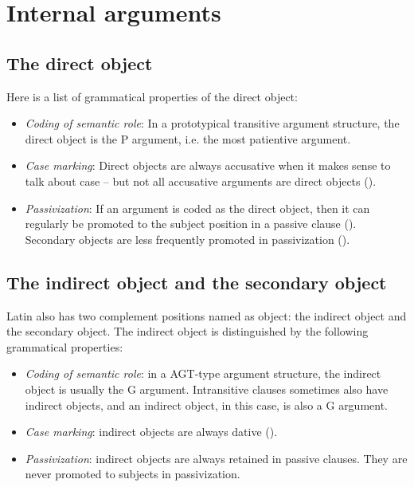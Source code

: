 \documentclass[a4paper, oneside, 12pt]{report}
\begin{document}
\section{Internal arguments}

\subsection{The direct object}\label{sec:vp.complement.direct-object}

Here is a list of grammatical properties of the direct object:
\begin{itemize}
    \item \emph{Coding of semantic role}: In a prototypical transitive argument structure, 
    the direct object is the P argument, i.e. the most patientive argument. 

    \item \emph{Case marking}: Direct objects are always accusative when it makes sense to talk about case -- 
    but not all accusative arguments are direct objects ().
    \item \emph{Passivization}: If an argument is coded as the direct object, 
    then it can regularly be promoted to the subject position in a passive clause (). 
    Secondary objects are less frequently promoted in passivization ().
\end{itemize}


\subsection{The indirect object and the secondary object}\label{sec:vp.complement.indirect-object}

Latin also has two complement positions named as object:
the indirect object and the secondary object.
The indirect object is distinguished by the following grammatical properties:
\begin{itemize}
    \item \emph{Coding of semantic role}: in a AGT-type argument structure, 
    the indirect object is usually the G argument.
    Intransitive clauses sometimes also have indirect objects, 
    and an indirect object, in this case, is also a G argument.
    \item \emph{Case marking}: indirect objects are always dative
    ().
    \item \emph{Passivization}: indirect objects are always retained in passive clauses. 
    They are never promoted to subjects in passivization.
\end{itemize}
\end{document}
